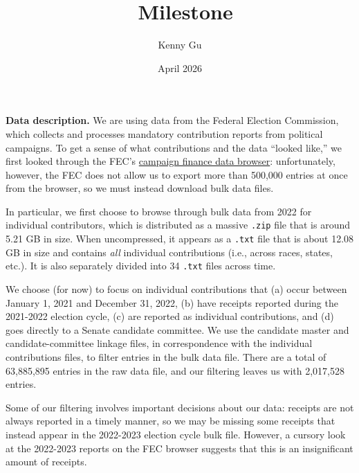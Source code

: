 \documentclass[11pt]{article}
\title{\class\ Milestone \hwnum}
\author{Kenny Gu}
\date{April 2026}
\newcommand{\class}{Stats 305c}
\newcommand{\hwnum}{2}
\newcommand{\quarter}{Spring 2026}
\begin{document}
 


\newcommand{\KL}{\text{KL}}
\newcommand{\pse}{\tilde{E}}
\newcommand{\Et}{\tilde{E}}
\newcommand{\bm}[1]{\mathbf{#1}}
\renewcommand{\d}{\mathrm{d}}

\textbf{Data description.} We are using data from the Federal Election Commission, which collects and processes mandatory contribution reports from political campaigns. To get a sense of what contributions and the data ``looked like,'' we first looked through the FEC's \href{https://www.fec.gov/data/receipts}{campaign finance data browser}: unfortunately, however, the FEC does not allow us to export more than 500,000 entries at once from the browser, so we must instead download bulk data files. 

In particular, we first choose to browse through bulk data from 2022 for individual contributors, which is distributed as a massive \texttt{.zip} file that is around 5.21 GB in size. When uncompressed, it appears as a \texttt{.txt} file that is about 12.08 GB in size and contains \emph{all} individual contributions (i.e., across races, states, etc.). It is also separately divided into 34 \texttt{.txt} files across time.

We choose (for now) to focus on individual contributions that (a) occur between January 1, 2021 and December 31, 2022, (b) have receipts reported during the 2021-2022 election cycle, (c) are reported as individual contributions, and (d) goes directly to a Senate candidate committee. We use the candidate master and candidate-committee linkage files, in correspondence with the individual contributions files, to filter entries in the bulk data file. There are a total of 63,885,895 entries in the raw data file, and our filtering leaves us with 2,017,528 entries. 

Some of our filtering involves important decisions about our data: receipts are not always reported in a timely manner, so we may be missing some receipts that instead appear in the 2022-2023 election cycle bulk file. However, a cursory look at the 2022-2023 reports on the FEC browser suggests that this is an insignificant amount of receipts. 
\end{document}
